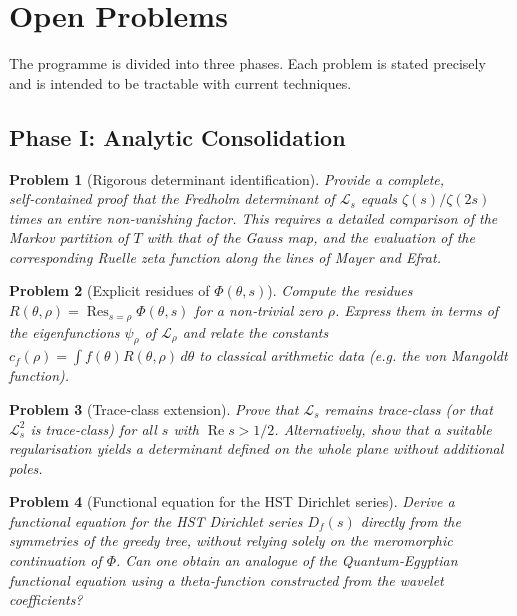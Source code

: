 \documentclass[11pt,a4paper]{article}
\newtheorem{problem}{Problem}[section]
\begin{document}
\section{Open Problems}

The programme is divided into three phases. Each problem is stated precisely and is intended to be tractable with current techniques.

\subsection*{Phase I: Analytic Consolidation}

\begin{problem}[Rigorous determinant identification]
Provide a complete, self‑contained proof that the Fredholm determinant of \(\mathcal{L}_s\) equals \(\zeta(s)/\zeta(2s)\) times an entire non‑vanishing factor. This requires a detailed comparison of the Markov partition of \(T\) with that of the Gauss map, and the evaluation of the corresponding Ruelle zeta function along the lines of Mayer and Efrat. 
\end{problem}

\begin{problem}[Explicit residues of \(\Phi(\theta,s)\)]
Compute the residues \(R(\theta,\rho)=\operatorname{Res}_{s=\rho}\Phi(\theta,s)\) for a non‑trivial zero \(\rho\). Express them in terms of the eigenfunctions \(\psi_\rho\) of \(\mathcal{L}_\rho\) and relate the constants \(c_f(\rho)=\int f(\theta)R(\theta,\rho)\,d\theta\) to classical arithmetic data (e.g. the von Mangoldt function). 
\end{problem}

\begin{problem}[Trace‑class extension]
Prove that \(\mathcal{L}_s\) remains trace‑class (or that \(\mathcal{L}_s^2\) is trace‑class) for all \(s\) with \(\operatorname{Re}s>1/2\). Alternatively, show that a suitable regularisation yields a determinant defined on the whole plane without additional poles.
\end{problem}

\begin{problem}[Functional equation for the HST Dirichlet series]
Derive a functional equation for the HST Dirichlet series \(D_f(s)\) directly from the symmetries of the greedy tree, without relying solely on the meromorphic continuation of \(\Phi\). Can one obtain an analogue of the Quantum‑Egyptian functional equation using a theta‑function constructed from the wavelet coefficients?
\end{problem}
\end{document}
